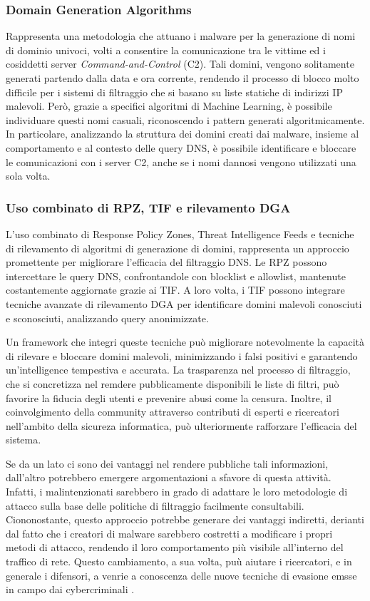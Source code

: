 \subsubsection{Domain Generation Algorithms}
Rappresenta una metodologia che attuano i malware per la generazione di nomi di dominio univoci, volti a consentire la comunicazione tra le vittime ed i cosiddetti server \textit{Command-and-Control} (C2). Tali domini, vengono solitamente generati partendo dalla data e ora corrente, rendendo il processo di blocco molto difficile per i  sistemi di filtraggio che si basano su liste statiche di indirizzi IP malevoli. Però, grazie a specifici algoritmi di Machine Learning, è possibile individuare questi nomi casuali, riconoscendo i pattern generati algoritmicamente. In particolare, analizzando la struttura dei domini creati dai malware, insieme al comportamento e al contesto delle query DNS, è possibile identificare e bloccare le comunicazioni con i server C2, anche se i nomi dannosi vengono utilizzati una sola volta.

\subsubsection{Uso combinato di RPZ, TIF e rilevamento DGA}
L'uso combinato di Response Policy Zones, Threat Intelligence Feeds e tecniche di rilevamento di algoritmi di generazione di domini, rappresenta un approccio promettente per migliorare l'efficacia del filtraggio DNS. Le RPZ possono intercettare le query DNS, confrontandole con blocklist e allowlist, mantenute costantemente aggiornate grazie ai TIF. A loro volta, i TIF possono integrare tecniche avanzate di rilevamento DGA per identificare domini malevoli conosciuti e sconosciuti, analizzando query anonimizzate.

Un framework che integri queste tecniche può migliorare notevolmente la capacità di rilevare e bloccare domini malevoli, minimizzando i falsi positivi e garantendo un'intelligence tempestiva e accurata. La trasparenza nel processo di filtraggio, che si concretizza nel remdere pubblicamente disponibili le liste di filtri, può favorire la fiducia degli utenti e prevenire abusi come la censura. Inoltre, il coinvolgimento della community attraverso contributi di esperti e ricercatori nell'ambito della sicureza informatica, può ulteriormente rafforzare l'efficacia del sistema.

Se da un lato ci sono dei vantaggi nel rendere pubbliche tali informazioni, dall'altro potrebbero emergere argomentazioni a sfavore di questa attività. Infatti, i malintenzionati sarebbero in grado di adattare le loro metodologie di attacco sulla base delle politiche di filtraggio facilmente consultabili. Ciononostante, questo approccio potrebbe generare dei vantaggi indiretti, derianti dal fatto che i creatori di malware sarebbero costretti a modificare i propri metodi di attacco, rendendo il loro comportamento più visibile all'interno del traffico di rete. Questo cambiamento, a sua volta, puù aiutare i ricercatori, e in generale i difensori, a venrie a conoscenza delle nuove tecniche di evasione emsse in campo dai cybercriminali \cite{DBLP:journals/corr/abs-2401-03864}.

